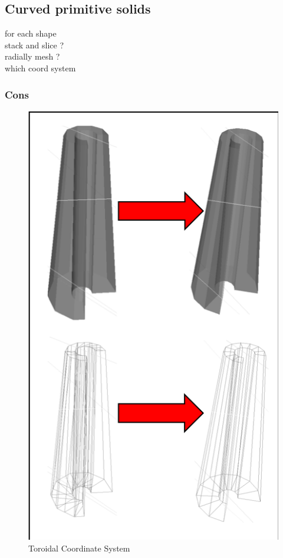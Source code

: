 \documentclass[12pt,a4paper]{article}
\begin{document}
\subsection{Curved primitive solids}
for each shape\\
stack and slice ?\\
radially mesh ?\\
which coord system

\newpage
\subsubsection{Cons}

\begin{figure}[h!]
\centering
\includegraphics[scale=0.5]{Images//Meshes//cons.png}
\caption[width=\columnwidth]{Toroidal Coordinate System}
\label{conts}
\end{figure}
\end{document}
